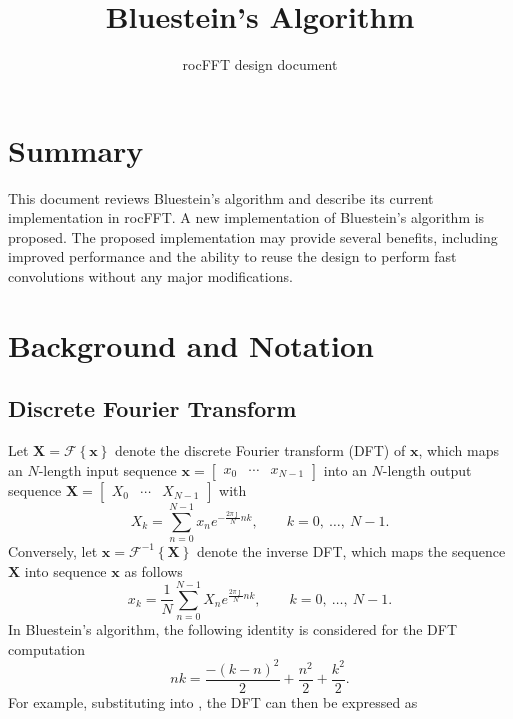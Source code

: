\documentclass[11pt]{scrartcl}
\begin{document}
\title{Bluestein's Algorithm}
\subtitle{rocFFT design document}
\date{\vspace{-5ex}}

\maketitle

\section{Summary}
This document reviews Bluestein's algorithm and describe its current implementation in rocFFT. A new implementation of Bluestein's algorithm is proposed. The proposed implementation may provide several benefits, including improved performance and the ability to reuse the design to perform fast convolutions without any major modifications.

\section{Background and Notation}

\subsection{Discrete Fourier Transform}
Let $ \mathbf{X} = \mathcal{F}\left\{ \mathbf{x} \right\}$ denote the discrete Fourier transform (DFT) of $\mathbf{x}$, which maps an $N$-length input sequence $\mathbf{x} = \begin{bmatrix} x_0 &  \cdots & x_{N-1} \end{bmatrix}$ into an $N$-length output sequence $\mathbf{X} = \begin{bmatrix} X_0 & \cdots & X_{N-1} \end{bmatrix}$ with
\begin{equation}
X_k = \sum_{n=0}^{N-1}{x_n e^{-\frac{2 \pi \jmath}{N}nk}}, \qquad k = 0, \ \ldots, \ N-1.
\label{eq:dft}
\end{equation}
Conversely, let $\mathbf{x} = \mathcal{F}^{-1}\left\{ \mathbf{X} \right\}$ denote the inverse DFT, which maps the sequence $\mathbf{X}$ into sequence $\mathbf{x}$ as follows
\begin{equation}
x_k = \frac{1}{N}\sum_{n=0}^{N-1}{X_n e^{\frac{2 \pi \jmath}{N}nk}}, \qquad k = 0, \ \ldots, \ N-1.
\label{eq:idft}
\end{equation}
In Bluestein's algorithm, the following identity is considered for the DFT computation
\begin{equation}
nk = \frac{-(k-n)^2}{2} + \frac{n^2}{2} + \frac{k^2}{2}.
\label{eq:index_identity}	
\end{equation}
For example, substituting  into , the DFT can then be expressed as
\end{document}
